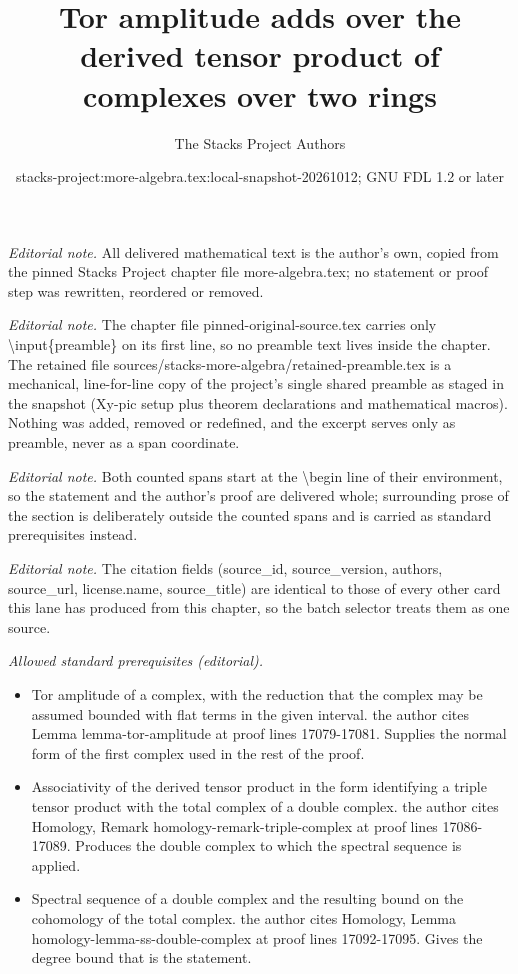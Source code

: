 \documentclass[10pt,a4paper]{amsart}
\title{Tor amplitude adds over the derived tensor product of complexes over two rings}
\author{The Stacks Project Authors}
\date{stacks-project:more-algebra.tex:local-snapshot-20261012; GNU FDL 1.2 or later}
\theoremstyle{plain}
\theoremstyle{definition}
\theoremstyle{remark}
\numberwithin{equation}{subsection}
\begin{document}
\maketitle
\setcounter{subsection}{1}
\noindent\textit{Editorial note.} All delivered mathematical text is the author's own, copied from the pinned Stacks Project chapter file more-algebra.tex; no statement or proof step was rewritten, reordered or removed.\par\medskip
\noindent\textit{Editorial note.} The chapter file pinned-original-source.tex carries only \textbackslash{}input\{preamble\} on its first line, so no preamble text lives inside the chapter. The retained file sources/stacks-more-algebra/retained-preamble.tex is a mechanical, line-for-line copy of the project's single shared preamble as staged in the snapshot (Xy-pic setup plus theorem declarations and mathematical macros). Nothing was added, removed or redefined, and the excerpt serves only as preamble, never as a span coordinate.\par\medskip
\noindent\textit{Editorial note.} Both counted spans start at the \textbackslash{}begin line of their environment, so the statement and the author's proof are delivered whole; surrounding prose of the section is deliberately outside the counted spans and is carried as standard prerequisites instead.\par\medskip
\noindent\textit{Editorial note.} The citation fields (source\_id, source\_version, authors, source\_url, license.name, source\_title) are identical to those of every other card this lane has produced from this chapter, so the batch selector treats them as one source.\par\medskip
\noindent\textit{Allowed standard prerequisites (editorial).}\begin{itemize}
\item Tor amplitude of a complex, with the reduction that the complex may be assumed bounded with flat terms in the given interval. the author cites Lemma lemma-tor-amplitude at proof lines 17079-17081. Supplies the normal form of the first complex used in the rest of the proof.
\item Associativity of the derived tensor product in the form identifying a triple tensor product with the total complex of a double complex. the author cites Homology, Remark homology-remark-triple-complex at proof lines 17086-17089. Produces the double complex to which the spectral sequence is applied.
\item Spectral sequence of a double complex and the resulting bound on the cohomology of the total complex. the author cites Homology, Lemma homology-lemma-ss-double-complex at proof lines 17092-17095. Gives the degree bound that is the statement.
\end{itemize}\medskip
\end{document}
